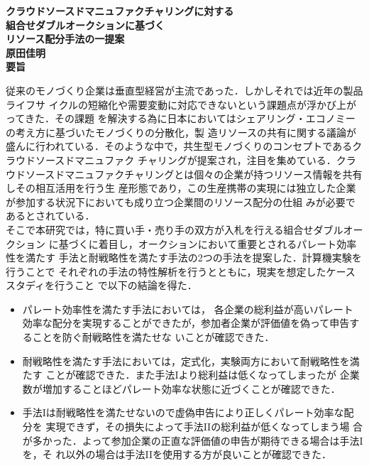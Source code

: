\newpage
\thispagestyle{empty}
\begin{center}
	\mbox{\LARGE{\bf{クラウドソースドマニュファクチャリングに対する}}} \\
	\mbox{\LARGE{\bf{組合せダブルオークションに基づく}}} \\
	\mbox{\LARGE{\bf{リソース配分手法の一提案}}} \\
	\vspace*{2mm}
	\mbox{\Large{\bf{原田佳明}}}\\
	\vspace*{7mm}
	{\LARGE\bf 要旨}
\end{center}\par
従来のモノづくり企業は垂直型経営が主流であった．しかしそれでは近年の製品ライフサ
イクルの短縮化や需要変動に対応できないという課題点が浮かび上がってきた．その課題
を解決する為に日本においてはシェアリング・エコノミーの考え方に基づいたモノづくりの分散化，製
造リソースの共有に関する議論が盛んに行われている．そのような中で，共生型モノづくりのコンセプトであるクラウドソースドマニュファク
チャリングが提案され，注目を集めている．クラウドソースドマニュファクチャリングとは個々の企業が持つリソース情報を共有しその相互活用を行う生
産形態であり，この生産携帯の実現には独立した企業が参加する状況下においても成り立つ企業間のリソース配分の仕組
みが必要であるとされている．\\
そこで本研究では，特に買い手・売り手の双方が入札を行える組合せダブルオークション
に基づくに着目し，オークションにおいて重要とされるパレート効率性を満たす
手法と耐戦略性を満たす手法の2つの手法を提案した．計算機実験を行うことで
それぞれの手法の特性解析を行うとともに，現実を想定したケーススタディを行うこと
で以下の結論を得た．
\begin{itemize}
\item パレート効率性を満たす手法においては， 各企業の総利益が高いパレート
  効率な配分を実現することができたが，参加者企業が評価値を偽って申告することを防ぐ耐戦略性を満たせな
  いことが確認できた．
\item 耐戦略性を満たす手法においては，定式化，実験両方において耐戦略性を満たす
ことが確認できた．また手法Iより総利益は低くなってしまったが
企業数が増加することほどパレート効率な状態に近づくことが確認できた．
\item 手法Iは耐戦略性を満たせないので虚偽申告により正しくパレート効率な配分を
  実現できず，その損失によって手法IIの総利益が低くなってしまう場
  合が多かった．よって参加企業の正直な評価値の申告が期待できる場合は手法Iを，そ
  れ以外の場合は手法IIを使用する方が良いことが確認できた．
\end{itemize}